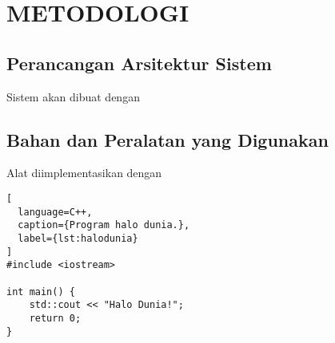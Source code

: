 \chapter{METODOLOGI}
\label{chap:metodologi}

\section{Perancangan Arsitektur Sistem}
\label{sec:deskripsisistem}

Sistem akan dibuat dengan

\section{Bahan dan Peralatan yang Digunakan}
\label{sec:implementasi alat}

Alat diimplementasikan dengan

\begin{lstlisting}[
  language=C++,
  caption={Program halo dunia.},
  label={lst:halodunia}
]
#include <iostream>

int main() {
    std::cout << "Halo Dunia!";
    return 0;
}
\end{lstlisting}



\lipsum[4]
